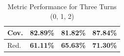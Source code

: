 \begin{table}[ht]
\begin{tabular}{|>{\arraybackslash}p{1cm}|c|c|c|}
Cov. & \textbf{82.89\%} & \textbf{81.82\%} & \textbf{87.84\%} \\ \hline
Red. & \textbf{61.11\%} & \textbf{65.63\%} & \textbf{71.30\%} \\ \hline


\end{tabular}
\caption{Metric Performance for Three Turns (0, 1, 2)}
\label{tab:metric_mini_perf}
\end{table}
